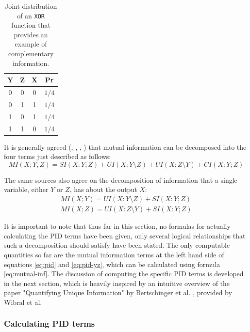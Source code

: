 \documentclass[12pt]{article}
\begin{document}
\begin{table}[h!]
\centering
\caption{Joint distribution of an \texttt{XOR} function that provides an example of complementary information.}
\begin{tabular}{|c c |c|c|}
	\hline
	Y & Z & X & Pr\\ 
	\hline
	0 & 0 & 0 & $1/4$ \\
	0 & 1 & 1 & $1/4$ \\ 
	1 & 0 & 1 & $1/4$ \\ 
	1 & 1 & 0 & $1/4$ \\ 
	\hline
\end{tabular}
\label{table:3}
\end{table}

It is generally agreed (\cite{williams-beer}, \cite{bertschinger}, \cite{pid-redundant}, \cite{pid-synergy}) that mutual information can be decomposed into the four terms just described as follows:
\begin{equation}
MI(X;Y,Z) = SI(X:Y;Z) + UI(X:Y \setminus Z) + UI(X:Z \setminus Y) + CI(X:Y;Z)
\label{eq:pid}
\end{equation}

The same sources also agree on the decomposition of information that a single variable, either $Y$ or $Z$, has about the output $X$: 
\begin{align}
MI(X;Y) = UI(X:Y \setminus Z) + SI(X:Y;Z) \nonumber \\
MI(X;Z) = UI(X:Z \setminus Y) + SI(X:Y;Z)
\label{eq:pid-yz}
\end{align}

It is important to note that thus far in this section, no formulas for actually calculating the PID terms have been given, only several logical relationships that such a decomposition should satisfy have been stated. The only computable quantities so far are the mutual information terms at the left hand side of equations \ref{eq:pid} and \ref{eq:pid-yz}, which can be calculated using formula \ref{eq:mutual-inf}. The discussion of computing the specific PID terms is developed in the next section, which is heavily inspired by an intuitive overview of the paper "Quantifying Unique Information" by Bertschinger et al. \cite{bertschinger}, provided by Wibral et al. \cite{pid-goal-functions} 

\subsubsection{Calculating PID terms}
\end{document}
